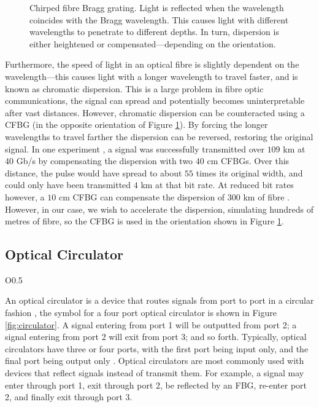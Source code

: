 \begin{figure}[tbp]
\centering

\caption[Chirped fibre Bragg grating.]{Chirped fibre Bragg grating. Light is reflected when the wavelength coincides with the Bragg wavelength. This causes light with different wavelengths to penetrate to different depths. In turn, dispersion is either heightened or compensated---depending on the orientation.}
\label{fig:cfbg}
\end{figure}

Furthermore, the speed of light in an optical fibre is slightly dependent on the wavelength---this causes light with a longer wavelength to travel faster, and is known as chromatic dispersion. This is a large problem in fibre optic communications, the signal can spread and potentially becomes uninterpretable after vast distances. However, chromatic dispersion can be counteracted using a CFBG \cite{agrawal2002, alazzawi, becker, starodoumov} (in the opposite orientation of Figure \ref{fig:cfbg}). By forcing the longer wavelengths to travel farther the dispersion can be reversed, restoring the original signal. In one experiment \cite{dong}, a signal was successfully transmitted over $109$ km at $40$ Gb/s by compensating the dispersion with two  $40$ cm CFBGs. Over this distance, the pulse would have spread to about $55$ times its original width, and could only have been transmitted $4$ km at that bit rate. At reduced bit rates however, a $10$ cm CFBG can compensate the dispersion of $300$ km of fibre \cite{agrawal2002}. However, in our case, we wish to accelerate the dispersion, simulating hundreds of metres of fibre, so the CFBG is used in the orientation shown in Figure \ref{fig:cfbg}. \\

\subsection{Optical Circulator}
\begin{wrapfigure}{O}{0.5\textwidth}
\centering

\caption{Symbol for a four port optical circulator.}
\label{fig:circulator}
\end{wrapfigure}
An optical circulator is a device that routes signals from port to port in a circular fashion \cite{agrawal2002, alazzawi, becker}, the symbol for a four port optical circulator is shown in Figure \ref{fig:circulator}. A signal entering from port 1 will be outputted from port 2; a signal entering from port 2 will exit from port 3; and so forth. Typically, optical circulators have three or four ports, with the first port being input only, and the final port being output only \cite{alazzawi}. Optical circulators are most commonly used with devices that reflect signals instead of transmit them. For example, a signal may enter through port 1, exit through port 2, be reflected by an FBG, re-enter port 2, and finally exit through port 3. \\

